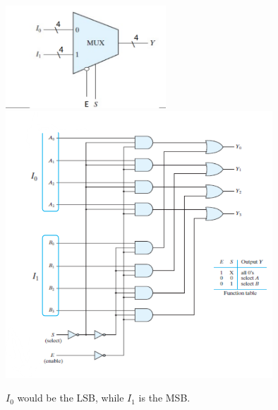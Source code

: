 \documentclass[a4paper,12pt]{article}
\begin{document}
            \includegraphics[width=6cm]{multbitmult.png}
            \includegraphics[width=10cm]{multbitmultschem.png}

            $I_0$ would be the LSB, while $I_1$ is the MSB.
\end{document}
